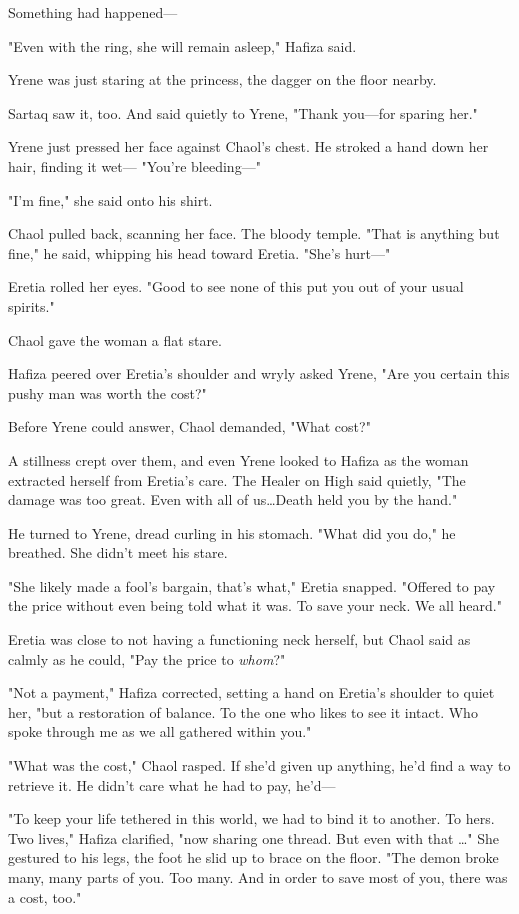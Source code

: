Something had happened---

"Even with the ring, she will remain asleep," Hafiza said.

Yrene was just staring at the princess, the dagger on the floor nearby.

Sartaq saw it, too.
And said quietly to Yrene, "Thank you---for sparing her."

Yrene just pressed her face against Chaol's chest.
He stroked a hand down her hair, finding it wet--- "You're bleeding---"

"I'm fine," she said onto his shirt.

Chaol pulled back, scanning her face.
The bloody temple.
"That is anything but fine," he said, whipping his head toward Eretia.
"She's hurt---"

Eretia rolled her eyes.
"Good to see none of this put you out of your usual spirits."

Chaol gave the woman a flat stare.

Hafiza peered over Eretia's shoulder and wryly asked Yrene, "Are you certain this pushy man was worth the cost?"

Before Yrene could answer, Chaol demanded, "What cost?"

A stillness crept over them, and even Yrene looked to Hafiza as the woman extracted herself from Eretia's care.
The Healer on High said quietly, "The damage was too great.
Even with all of us\ldots Death held you by the hand."

He turned to Yrene, dread curling in his stomach.
"What did you do," he breathed.
She didn't meet his stare.

"She likely made a fool's bargain, that's what," Eretia snapped.
"Offered to pay the price without even being told what it was.
To save your neck.
We all heard."

Eretia was close to not having a functioning neck herself, but Chaol said as calmly as he could, "Pay the price to \emph{whom}?"

"Not a payment," Hafiza corrected, setting a hand on Eretia's shoulder to quiet her, "but a restoration of balance.
To the one who likes to see it intact.
Who spoke through me as we all gathered within you."

"What was the cost," Chaol rasped.
If she'd given up anything, he'd find a way to retrieve it.
He didn't care what he had to pay, he'd---

"To keep your life tethered in this world, we had to bind it to another.
To hers.
Two lives," Hafiza clarified, "now sharing one thread.
But even with that \ldots" She gestured to his legs, the foot he slid up to brace on the floor.
"The demon broke many, many parts of you.
Too many.
And in order to save most of you, there was a cost, too."

